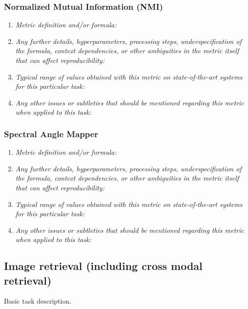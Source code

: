 \documentclass[a4paper,11pt]{article}
\begin{document}
        \subsubsection{Normalized Mutual Information (NMI)}
            \begin{enumerate}[label=\alph*.]
                \item \textit{Metric definition and/or formula:}
                \bigskip
                \item \textit{Any further details, hyperparameters, processing steps, underspecification of the formula, context dependencies, or other ambiguities in the metric itself that can affect reproducibility:}
                \bigskip
                \item \textit{Typical range of values obtained with this metric on state-of-the-art systems for this particular task:}
                \bigskip
                \item \textit{Any other issues or subtleties that should be mentioned regarding this metric when applied to this task:}
                \bigskip
            \end{enumerate}
        \subsubsection{Spectral Angle Mapper}
            \begin{enumerate}[label=\alph*.]
                \item \textit{Metric definition and/or formula:}
                \bigskip
                \item \textit{Any further details, hyperparameters, processing steps, underspecification of the formula, context dependencies, or other ambiguities in the metric itself that can affect reproducibility:}
                \bigskip
                \item \textit{Typical range of values obtained with this metric on state-of-the-art systems for this particular task:}
                \bigskip
                \item \textit{Any other issues or subtleties that should be mentioned regarding this metric when applied to this task:}
                \bigskip
            \end{enumerate}


    \subsection{Image retrieval (including cross modal retrieval)}
    Basic task description.
\end{document}
